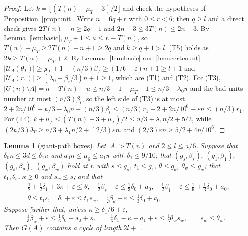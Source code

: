 \documentclass[11pt,a4paper]{article}
\newtheorem{lemma}[theorem]{Lemma}
\theoremstyle{definition}
\theoremstyle{remark}
\newcommand{\eps}{\varepsilon}
\newcommand{\UA}{\mathcal{U}_A}
\begin{document}
\begin{proof}
Let $k=\lfloor(T(n)-\mu_T+3)/2\rfloor$ and check the hypotheses of Proposition~\ref{prop:unit}. Write
$n=6q+r$ with $0\le r<6$; then $q\ge l$ and a direct check gives $2T(n)-n\ge2q-1$ and $2n-3\le3T(n)\le2n+3$.
By Lemma~\ref{lem:basic}, $\mu_T+1\le u\le n-T(n)$, so $T(n)-\mu_T\ge2T(n)-n+1\ge2q$ and $k\ge q+1>l$.
(T5) holds as $2k\ge T(n)-\mu_T+2$. By Lemmas~\ref{lem:basic} and \ref{lem:certcount},
$|\UA(\theta_T)|\ge\mu_T+1-(n/3)\beta_T\ge(1/6+\eps)n+1\ge l+1$ and $|\UA(r_1)|\ge(\lambda_0-
\beta_r/3)n+1\ge1$, which are (T1) and (T2). For (T3), $|U(n)\setminus A|=n-T(n)-u\le n/3+1-\mu_T-1
\le n/3-\lambda_0n$ and the bad units number at most $(n/3)\beta_t$, so the left side of (T3) is at
most $2+2n/10^6+n/3-\lambda_0n+(n/3)\beta_t\le(n/3)r_1+2+2n/10^6-\eps n\le(n/3)r_1$. For (T4),
$k+\mu_T\le(T(n)+3+\mu_T)/2\le n/3+\lambda_1n/2+5/2$, while $(2n/3)\theta_T\ge n/3+\lambda_1n/2+
(2/3)\eps n$, and $(2/3)\eps n\ge5/2+4n/10^6$.
\end{proof}

\begin{lemma}[giant-path boxes]\label{lem:gpbox}
Let $|A|>T(n)$ and $2\le l\le n/6$. Suppose that $\delta_0n\le3d\le\delta_1n$ and $a_0n\le\mu_6\le
a_1n$ with $\delta_1\le9/10$; that $(g_s,\beta_s)$, $(g_1,\beta_1)$, $(g_\theta,\beta_\theta)$,
$(g_w,\beta_w)$ hold at $n$ with $s\le g_s$, $t_1\le g_1$, $\theta\le g_\theta$, $\theta_w\le g_w$; that
$t_1,\theta_w,\kappa\ge0$ and $s_w\le s$; and that
\[
\begin{aligned}
  &\tfrac12+\tfrac12\delta_1+3\kappa+\eps\le\theta,\quad
  \tfrac12\beta_s+\eps\le\tfrac13\delta_0+a_0,\quad
  \tfrac12\beta_1+\eps\le\tfrac16+\tfrac13\delta_0+a_0,\\
  &\theta\le t_1s,\quad
  \delta_1+\eps\le t_1s_w,\quad
  \tfrac12\beta_\theta+\eps\le\tfrac13\delta_0+a_0 .
\end{aligned}
\]
Suppose further that, unless $\kappa\ge\delta_1/6+\eps$,
\[
  \tfrac13\beta_w+\eps\le\tfrac16\delta_0+a_0+\kappa,\qquad
  \tfrac16\delta_1-\kappa+a_1+\eps\le\tfrac16\theta_ws_w,\qquad s_w\le\theta_w .
\]
Then $G(A)$ contains a cycle of length $2l+1$.
\end{lemma}
\end{document}
